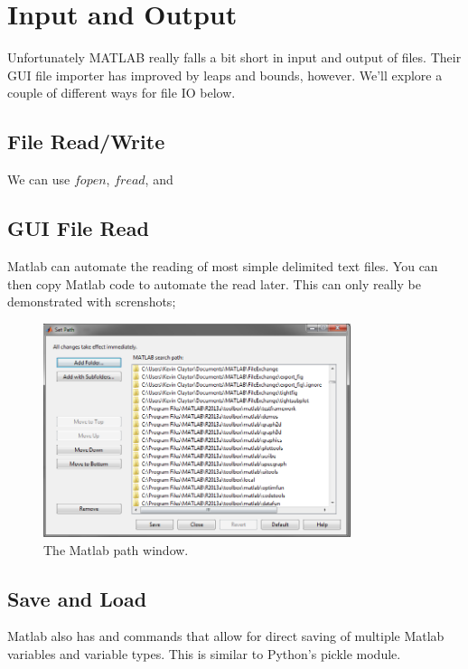 
\section{Input and Output}
Unfortunately MATLAB really falls a bit short in input and output of files.
 Their GUI file importer has improved by leaps and bounds, however.
 We'll explore a couple of different ways for file IO below.

\subsection{File Read/Write}
We can use $fopen$, $fread$, and %

\begin{quote}

\end{quote}

\pagebreak
\subsection{GUI File Read}
Matlab can automate the reading of most simple delimited text files.
 You can then copy Matlab code to automate the read later.
 This can only really be demonstrated with screnshots;

\begin{figure}[ht!]
\centering
\includegraphics[width=90mm]{img/path.png}
\caption{The Matlab path window.}
\label{overflow}
\end{figure}

\pagebreak
\subsection{Save and Load}
Matlab also has  and  commands that allow for direct saving of multiple Matlab variables and variable types.
 This is similar to Python's pickle module.

\begin{quote}
 
\end{quote}
